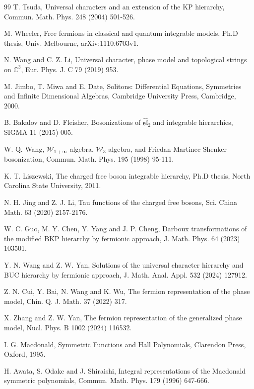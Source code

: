 \documentclass[11pt,reqno]{amsart}
\numberwithin{equation}{section}
\begin{document}
\begin{thebibliography}{99}
T. Tsuda, Universal characters and an extension of the KP hierarchy, Commun. Math. Phys. 248 (2004) 501-526.



M. Wheeler, Free fermions in classical and quantum integrable models, Ph.D thesis, Univ. Melbourne, arXiv:1110.6703v1.


N. Wang and C. Z. Li, Universal character, phase model and topological strings on $\mathbb{C}^{3}$, Eur. Phys. J. C 79 (2019) 953.


M. Jimbo, T. Miwa and E. Date, Solitons: Differential Equations, Symmetries and Infinite Dimensional Algebras, Cambridge University Press, Cambridge, 2000.

B. Bakalov and D. Fleisher, Bosonizations of $\mathfrak{\widehat{sl}}_{2}$ and integrable hierarchies, SIGMA 11 (2015) 005.


W. Q. Wang, $\mathcal{W}_{1+\infty}$ algebra, $\mathcal{W}_{3}$ algebra, and Friedan-Martinec-Shenker bosonization, Commun. Math. Phys. 195 (1998) 95-111.

K. T. Liszewski, The charged free boson integrable hierarchy, Ph.D thesis, North Carolina State University, 2011.

N. H. Jing and Z. J. Li, Tau functions of the charged free bosons, Sci. China Math. 63 (2020) 2157-2176.

W. C. Guo, M. Y. Chen, Y. Yang and J. P. Cheng, Darboux transformations of the modified BKP hierarchy by fermionic approach, J. Math. Phys. 64 (2023) 103501.

Y. N. Wang and Z. W. Yan, Solutions of the universal character hierarchy and BUC hierarchy by fermionic approach, J. Math. Anal. Appl. 532 (2024) 127912.

Z. N. Cui, Y. Bai, N. Wang and K. Wu, The fermion representation of the phase model, Chin. Q. J. Math. 37 (2022) 317.

X. Zhang and Z. W. Yan, The fermion representation of the generalized phase model, Nucl. Phys. B 1002 (2024) 116532.

I. G. Macdonald, Symmetric Functions and Hall Polynomials, Clarendon Press, Oxford, 1995.

H. Awata, S. Odake and J. Shiraishi, Integral representations of the Macdonald symmetric polynomials, Commun. Math. Phys. 179 (1996) 647-666.


\end{thebibliography}
\end{document}
